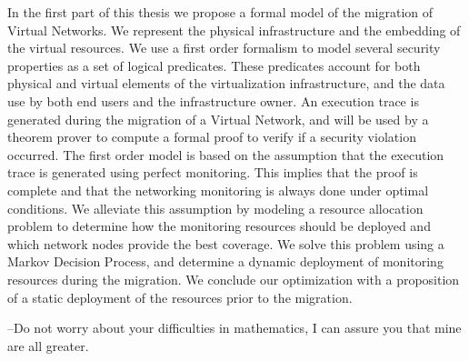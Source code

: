 \documentclass[a4paper, 11pt]{report}
\theoremstyle{definition}
\begin{document}
In the first part of this thesis we propose a formal model of the migration of Virtual Networks. We represent the physical infrastructure and the embedding of the virtual resources. We use a first order formalism to model several security properties as a set of logical predicates. These predicates account for both physical and virtual elements of the virtualization infrastructure, and the data use by both end users and the infrastructure owner.
An execution trace is generated during the migration of a Virtual Network, and will be used by a theorem prover to compute a formal proof to verify if a security violation occurred. The first order model is based on the assumption that the execution trace is generated using perfect monitoring. This implies that the proof is complete and that the networking monitoring is always done under optimal conditions.
We alleviate this assumption by modeling a resource allocation problem to determine how the monitoring resources should be deployed and which network nodes provide the best coverage. We solve this problem using a Markov Decision Process, and determine a dynamic deployment of monitoring resources during the migration. We conclude our optimization with a proposition of a static deployment of the resources prior to the migration.

\setcounter{page}{2}
\begin{savequote}
--Do not worry about your difficulties in mathematics, I can assure you that mine are all greater.
\end{savequote}
\end{document}
